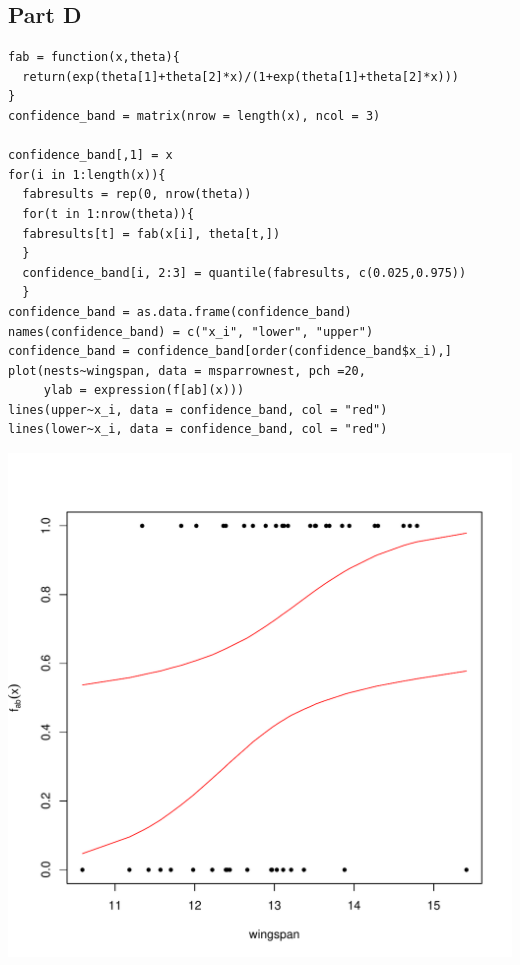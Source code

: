 \documentclass{article}\usepackage[]{graphicx}\usepackage[]{color}
\makeatletter
\newenvironment{kframe}{%
 \def\at@end@of@kframe{}%
 \ifinner\ifhmode%
  \def\at@end@of@kframe{\end{minipage}}%
  \begin{minipage}{\columnwidth}%
 \fi\fi%
 \def\FrameCommand##1{\hskip\@totalleftmargin \hskip-\fboxsep
 \colorbox{shadecolor}{##1}\hskip-\fboxsep
     \hskip-\linewidth \hskip-\@totalleftmargin \hskip\columnwidth}%
 \MakeFramed {\advance\hsize-\width
   \@totalleftmargin\z@ \linewidth\hsize
   \@setminipage}}%
 {\par\unskip\endMakeFramed%
 \at@end@of@kframe}
\newenvironment{knitrout}{}{} %
\makeatother
\begin{document}
\subsection*{Part D}
\begin{knitrout}
\color{fgcolor}\begin{kframe}
\begin{verbatim}
fab = function(x,theta){
  return(exp(theta[1]+theta[2]*x)/(1+exp(theta[1]+theta[2]*x)))
}
confidence_band = matrix(nrow = length(x), ncol = 3)

confidence_band[,1] = x
for(i in 1:length(x)){
  fabresults = rep(0, nrow(theta))
  for(t in 1:nrow(theta)){
  fabresults[t] = fab(x[i], theta[t,])
  }
  confidence_band[i, 2:3] = quantile(fabresults, c(0.025,0.975))
  }
confidence_band = as.data.frame(confidence_band)
names(confidence_band) = c("x_i", "lower", "upper")
confidence_band = confidence_band[order(confidence_band$x_i),]
plot(nests~wingspan, data = msparrownest, pch =20, 
     ylab = expression(f[ab](x)))
lines(upper~x_i, data = confidence_band, col = "red")
lines(lower~x_i, data = confidence_band, col = "red")
\end{verbatim}
\end{kframe}
\includegraphics[width=0.50\linewidth]{figure/unnamed-chunk-13-1} 

\end{knitrout}
\end{document}
